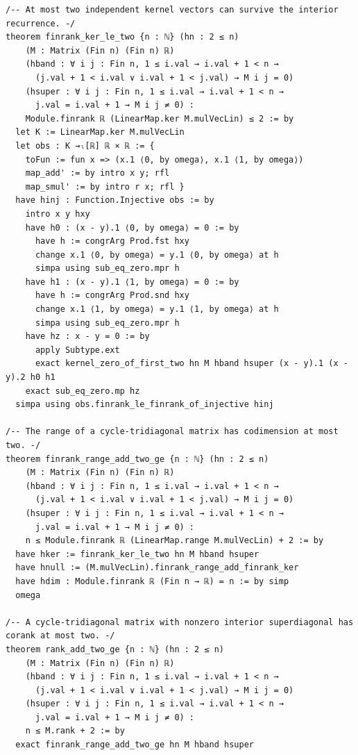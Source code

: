 \documentclass[11pt,a4paper]{article}
\begin{document}
\begin{Verbatim}[breaklines,breakanywhere,fontsize=\footnotesize]
/-- At most two independent kernel vectors can survive the interior recurrence. -/
theorem finrank_ker_le_two {n : ℕ} (hn : 2 ≤ n)
    (M : Matrix (Fin n) (Fin n) ℝ)
    (hband : ∀ i j : Fin n, 1 ≤ i.val → i.val + 1 < n →
      (j.val + 1 < i.val ∨ i.val + 1 < j.val) → M i j = 0)
    (hsuper : ∀ i j : Fin n, 1 ≤ i.val → i.val + 1 < n →
      j.val = i.val + 1 → M i j ≠ 0) :
    Module.finrank ℝ (LinearMap.ker M.mulVecLin) ≤ 2 := by
  let K := LinearMap.ker M.mulVecLin
  let obs : K →ₗ[ℝ] ℝ × ℝ := {
    toFun := fun x => (x.1 ⟨0, by omega⟩, x.1 ⟨1, by omega⟩)
    map_add' := by intro x y; rfl
    map_smul' := by intro r x; rfl }
  have hinj : Function.Injective obs := by
    intro x y hxy
    have h0 : (x - y).1 ⟨0, by omega⟩ = 0 := by
      have h := congrArg Prod.fst hxy
      change x.1 ⟨0, by omega⟩ = y.1 ⟨0, by omega⟩ at h
      simpa using sub_eq_zero.mpr h
    have h1 : (x - y).1 ⟨1, by omega⟩ = 0 := by
      have h := congrArg Prod.snd hxy
      change x.1 ⟨1, by omega⟩ = y.1 ⟨1, by omega⟩ at h
      simpa using sub_eq_zero.mpr h
    have hz : x - y = 0 := by
      apply Subtype.ext
      exact kernel_zero_of_first_two hn M hband hsuper (x - y).1 (x - y).2 h0 h1
    exact sub_eq_zero.mp hz
  simpa using obs.finrank_le_finrank_of_injective hinj

/-- The range of a cycle-tridiagonal matrix has codimension at most two. -/
theorem finrank_range_add_two_ge {n : ℕ} (hn : 2 ≤ n)
    (M : Matrix (Fin n) (Fin n) ℝ)
    (hband : ∀ i j : Fin n, 1 ≤ i.val → i.val + 1 < n →
      (j.val + 1 < i.val ∨ i.val + 1 < j.val) → M i j = 0)
    (hsuper : ∀ i j : Fin n, 1 ≤ i.val → i.val + 1 < n →
      j.val = i.val + 1 → M i j ≠ 0) :
    n ≤ Module.finrank ℝ (LinearMap.range M.mulVecLin) + 2 := by
  have hker := finrank_ker_le_two hn M hband hsuper
  have hnull := (M.mulVecLin).finrank_range_add_finrank_ker
  have hdim : Module.finrank ℝ (Fin n → ℝ) = n := by simp
  omega

/-- A cycle-tridiagonal matrix with nonzero interior superdiagonal has corank at most two. -/
theorem rank_add_two_ge {n : ℕ} (hn : 2 ≤ n)
    (M : Matrix (Fin n) (Fin n) ℝ)
    (hband : ∀ i j : Fin n, 1 ≤ i.val → i.val + 1 < n →
      (j.val + 1 < i.val ∨ i.val + 1 < j.val) → M i j = 0)
    (hsuper : ∀ i j : Fin n, 1 ≤ i.val → i.val + 1 < n →
      j.val = i.val + 1 → M i j ≠ 0) :
    n ≤ M.rank + 2 := by
  exact finrank_range_add_two_ge hn M hband hsuper


\end{Verbatim}
\end{document}
